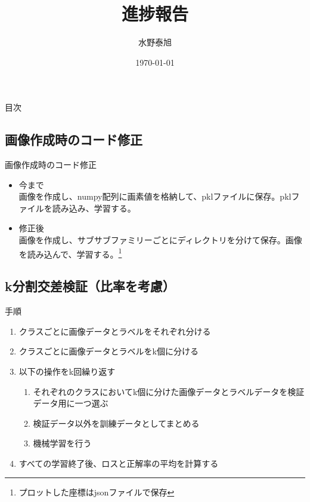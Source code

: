 \documentclass[leno,xcolor=dvipsnames]{beamer}
\title{進捗報告}
\date{\today}
\author{水野泰旭}
\institute{弘前大学理工学部電子情報工学科４年}
\begin{document}
  \maketitle
  
\begin{frame}{目次}
    \tableofcontents
\end{frame}

\begin{frame}
    \section{画像作成時のコード修正}
\end{frame}

\begin{frame}{画像作成時のコード修正}
    \begin{itemize}
        \item 今まで\mbox{} \\ 画像を作成し、numpy配列に画素値を格納して、pklファイルに保存。pklファイルを読み込み、学習する。
        \item 修正後\mbox{} \\ 画像を作成し、サブサブファミリーごとにディレクトリを分けて保存。画像を読み込んで、学習する。\footnote{プロットした座標はjsonファイルで保存}
    \end{itemize}
\end{frame}

\begin{frame}
    \section{k分割交差検証（比率を考慮）}
\end{frame}

\begin{frame}{手順}
    \begin{enumerate}
        \item クラスごとに画像データとラベルをそれぞれ分ける
        \item クラスごとに画像データとラベルをk個に分ける
        \item 以下の操作をk回繰り返す
        \begin{enumerate}
            \item それぞれのクラスにおいてk個に分けた画像データとラベルデータを検証データ用に一つ選ぶ
            \item 検証データ以外を訓練データとしてまとめる
            \item 機械学習を行う
        \end{enumerate} 
        \item すべての学習終了後、ロスと正解率の平均を計算する
    \end{enumerate}
\end{frame}
\end{document}
